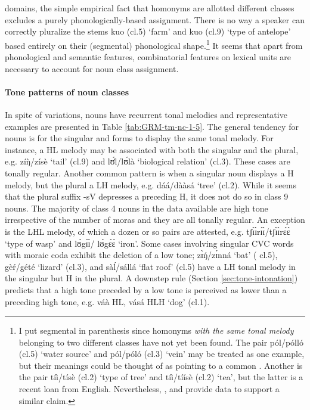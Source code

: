 \begin{exe}
\begin{exe}
\begin{exe}
\begin{exe}
\begin{exe}
\begin{exe}
domains, the simple empirical fact that homonyms are allotted different classes  excludes a purely phonologically-based  assignment. There is no way a speaker can correctly pluralize the stems {\sls kuo} ({\sc cl.5})  `farm' and   {\sls kuo} ({\sc cl.9})  `type of antelope' based entirely on their (segmental) phonological shape.\footnote{I put segmental in parenthesis since  homonyms {\it with the same tonal melody} belonging to two different classes have not yet been  found. The pair {\sls pól}/{\sls pólló} ({\sc cl.5}) `water source' and {\sls pól}/{\sls póló} ({\sc cl.3}) `vein' may be treated as one example,  but their meanings could be thought of as pointing to a common .  Another is the pair  {\sls  tíì}/{\sls  tísè} ({\sc cl.2}) `type of tree' and {\sls  tíì}/{\sls  tíísè} ({\sc cl.2}) `tea', but the latter is a recent loan from English. Nevertheless, \citet{Bonv88}, \citet{Awed07} and \citet{Tcha07} provide data to support a similar claim.} It seems that apart from phonological and semantic features, combinatorial features on lexical units are necessary to account for noun class assignment.


\paragraph{Tone patterns of noun classes}
\label{sec:GRM-tone-p}


In
spite of variations,  nouns have recurrent  tonal melodies and representative examples are presented in
Table \ref{tab:GRM-tm-nc-1-5}.  The  general tendency for nouns is for 
the singular and   forms to display the same tonal melody.  For
instance, a HL melody may be associated with both the singular and the plural,
e.g.  {\sls zíŋ̀}/{\sls zísè} `tail' ({\sc cl.9}) 
and   {\sls lʊ́l̀}/{\sls lʊ́là} `biological relation'  ({\sc cl.3}). These 
cases 
are tonally regular. 
Another common pattern is when a singular noun displays a H melody, but the
plural a LH melody, e.g.  {\sls dáá}/{\sls dààsá} `tree' ({\sc cl.2}). 
While 
it
 seems that  the
plural suffix -{\sls sV}  depresses a preceding H,  it does not do so in class 9 nouns. The 
majority 
of class 4 nouns in the data available are high tone irrespective of the number of moras and they 
are all tonally regular.  An exception is the LHL melody, of which a dozen or so pairs are 
attested, e.g.  {\sls tʃɪ̀ɪ̀rɪ́ɪ̀}/{\sls  tʃɪ̀ɪ̀rɛ́ɛ̀} `type of wasp' and  {\sls  lʊ̀gɪ́ɪ̀}/{\sls  
lʊ̀gɛ́ɛ̀} `iron'. Some cases involving
singular CVC words with moraic
coda exhibit the deletion of a low tone;  {\sls zɪ̀ŋ́}/{\sls zɪ́nná} `bat' 
({\sc 
cl.5}),   {\sls gèŕ}/{\sls gété} `lizard' ({\sc cl.3}),  and
{\sls sàĺ}/{\sls sállá} `flat roof' ({\sc cl.5})  have a LH tonal melody in 
the
singular but  H in the plural. A downstep rule (Section
\ref{sec:tone-intonation})  predicts that a high tone preceded by a low tone is
perceived as lower than a preceding high
tone, e.g. {\sls váà}  {HL},  {\sls vá{\ꜜ}sá}  {HLH}  `dog' 
({\sc cl.1}).  


\end{exe}
\end{exe}
\end{exe}
\end{exe}
\end{exe}
\end{exe}
